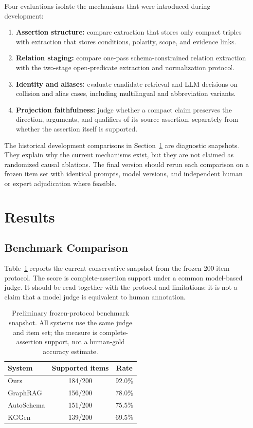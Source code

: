 \documentclass[11pt]{article}
\begin{document}
Four evaluations isolate the mechanisms that were introduced during development:
\begin{enumerate}
  \item \textbf{Assertion structure:} compare extraction that stores only compact triples with extraction that stores conditions, polarity, scope, and evidence links.
  \item \textbf{Relation staging:} compare one-pass schema-constrained relation extraction with the two-stage open-predicate extraction and normalization protocol.
  \item \textbf{Identity and aliases:} evaluate candidate retrieval and LLM decisions on collision and alias cases, including multilingual and abbreviation variants.
  \item \textbf{Projection faithfulness:} judge whether a compact claim preserves the direction, arguments, and qualifiers of its source assertion, separately from whether the assertion itself is supported.
\end{enumerate}

The historical development comparisons in Section~\ref{sec:results} are diagnostic snapshots. They explain why the current mechanisms exist, but they are not claimed as randomized causal ablations. The final version should rerun each comparison on a frozen item set with identical prompts, model versions, and independent human or expert adjudication where feasible.

\section{Results}
\label{sec:results}

\subsection{Benchmark Comparison}

Table~\ref{tab:benchmark} reports the current conservative snapshot from the frozen 200-item protocol. The score is complete-assertion support under a common model-based judge. It should be read together with the protocol and limitations: it is not a claim that a model judge is equivalent to human annotation.

\begin{table}[t]
\centering
\small
\begin{tabular}{lcc}
\toprule
System & Supported items & Rate \\
\midrule
Ours & 184/200 & 92.0\% \\
GraphRAG & 156/200 & 78.0\% \\
AutoSchema & 151/200 & 75.5\% \\
KGGen & 139/200 & 69.5\% \\
\bottomrule
\end{tabular}
\caption{Preliminary frozen-protocol benchmark snapshot. All systems use the same judge and item set; the measure is complete-assertion support, not a human-gold accuracy estimate.}
\label{tab:benchmark}
\end{table}
\end{document}
